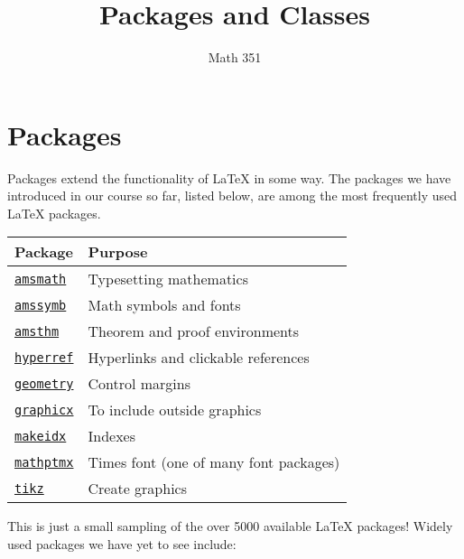 \documentclass{paper}
\title{Packages and Classes}
\author{Math 351}
\date{}
\begin{document}
\maketitle

\section{Packages}

Packages extend the functionality of \LaTeX{} in some way.  
The packages we have introduced in our course so far, listed below, are among the 
most frequently used \LaTeX{} packages.

\begin{center}
\begin{tabular}{l l}
\toprule 

Package & Purpose \\

\midrule

\href{ftp://ftp.ams.org/ams/doc/amsmath/amsldoc.pdf}{\texttt{amsmath}} & 
Typesetting mathematics \\

\href{https://www.ctan.org/pkg/amssymb}{\texttt{amssymb}} & 
Math symbols and fonts \\

\href{https://www.ctan.org/pkg/amsthm}{\texttt{amsthm}} & 
Theorem and proof environments \\

\href{https://www.ctan.org/pkg/hyperref}{\texttt{hyperref}} 
& Hyperlinks and clickable references \\

\href{https://www.ctan.org/pkg/geometry}{\texttt{geometry}} & 
Control margins \\

\href{https://www.ctan.org/pkg/graphicx}{\texttt{graphicx}} 
& To include outside graphics \\

\href{https://www.ctan.org/pkg/makeindex}{\texttt{makeidx}} & 
Indexes \\

\href{https://www.ctan.org/pkg/mathptmx}{\texttt{mathptmx}} & 
Times font (one of many font packages) \\ 

\href{https://www.ctan.org/pkg/pgf}{\texttt{tikz}} & 
Create graphics \\
\bottomrule
\end{tabular}
\end{center}
This is just a small sampling of the over 5000 available \LaTeX{} packages!  Widely used packages 
we have yet to see include:
\end{document}
